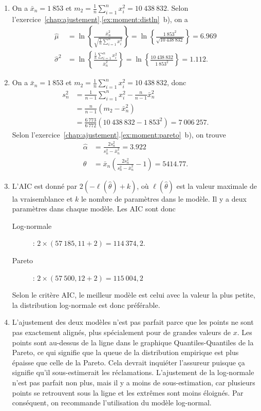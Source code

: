 \begin{exercice}
\begin{sol}
\begin{enumerate}
\item On a $\bar x_n=1~853$ et $m_2=\frac{1}{n}\sum_{i=1}^n x_i^2 = 10~438~832$. Selon l'exercice~\ref{chap:ajustement}.\ref{ex:moment:distln}~b), on a
\begin{align*}
\hat \mu &= \ln\left\{\frac{\bar x_n^2}{\sqrt{\frac{1}{n}\sum_{i=1}^n x_i^2}} \right\}=\ln\left\{\frac{1~853^2}{\sqrt{10~438~832}} \right\}=6.969\\
\hat\sigma^2 &= \ln\left\{\frac{\frac{1}{n}\sum_{i=1}^n x_i^2}{\bar x_n^2} \right\}=  \ln\left\{\frac{10~438~832}{1~853^2} \right\}=1.112.
\end{align*}


\item On a $\bar x_n=1~853$ et $m_2=\frac{1}{n}\sum_{i=1}^n x_i^2 = 10~438~832$, donc 
\begin{align*}
s_n^2&=\frac{1}{n-1}\sum_{i=1}^n x_i^2 - \frac{n}{n-1}\bar x_n^2\\
& = \frac{n}{n-1}(m_2-\bar x_n^2)\\
&=\frac{6~773}{6~772}(10~438~832-1~853^2)=7~006~257.
\end{align*}
Selon l'exercice~\ref{chap:ajustement}.\ref{ex:moment:pareto}~b), on trouve
\begin{align*}
\hat\alpha &= \frac{2s_n^2}{s_n^2-\bar x_n^2}=3.922\\
\hat\theta&=\bar x_n \left(\frac{2s_n^2}{s_n^2-\bar x_n^2} -1\right)=5414.77.
\end{align*}


\item L'AIC est donné par $2(-\ell(\hat\theta)+k)$, où $\ell(\hat\theta)$ est la valeur maximale de la vraisemblance et $k$ le nombre de paramètres dans le modèle. Il y a deux paramètres dans chaque modèle. Les AIC sont donc
\begin{description}
\item[Log-normale]: $2\times(57~185,11+2)=114~374,2$.
\item[Pareto]: $2\times(57~500,12+2)=115~004,2$
\end{description}
Selon le critère AIC, le meilleur modèle est celui avec la valeur la plus petite, la distribution log-normale est donc préférable.

\item L'ajustement des deux modèles n'est pas parfait parce que les points ne sont pas exactement alignés, plus spécialement pour de grandes valeurs de $x$. Les points sont au-dessus de la ligne dans le graphique Quantiles-Quantiles de la Pareto, ce qui signifie que la queue de la distribution empirique est plus épaisse que celle de la Pareto. Cela devrait inquiéter l'assureur puisque ça signifie qu'il sous-estimerait les réclamations. L'ajustement de la log-normale n'est pas parfait non plus, mais il y a moins de sous-estimation, car plusieurs points se retrouvent sous la ligne et les extrêmes sont moins éloignés. Par conséquent, on recommande l'utilisation du modèle log-normal.


\end{enumerate}
\end{sol}
\end{exercice}
